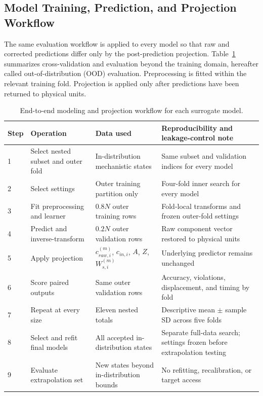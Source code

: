 \documentclass[a4paper,fleqn]{cas-sc}
\begin{document}
\subsection{Model Training, Prediction, and Projection Workflow}

The same evaluation workflow is applied to every model so that raw and corrected predictions differ only by the post-prediction projection. Table~\ref{tab:modeling_workflow} summarizes cross-validation and evaluation beyond the training domain, hereafter called out-of-distribution (OOD) evaluation. Preprocessing is fitted within the relevant training fold. Projection is applied only after predictions have been returned to physical units.

\begin{table}[htbp]
\centering
\caption{End-to-end modeling and projection workflow for each surrogate model.}
\label{tab:modeling_workflow}
\scriptsize
\setlength{\tabcolsep}{3pt}
\begin{tabular}{p{0.7cm}p{3.3cm}p{3.0cm}p{4.2cm}}
\hline
Step & Operation & Data used & Reproducibility and leakage-control note \\
\hline
1 & Select nested subset and outer fold & In-distribution mechanistic states & Same subset and validation indices for every model \\
2 & Select settings & Outer training partition only & Four-fold inner search for every model \\
3 & Fit preprocessing and learner & $0.8N$ outer training rows & Fold-local transforms and frozen outer-fold settings \\
4 & Predict and inverse-transform & $0.2N$ outer validation rows & Raw component vector restored to physical units \\
5 & Apply projection & $c_{raw,i}^{(m)}$, $c_{in,i}$, $A$, $Z$, $W_{s,i}^{(m)}$ & Underlying predictor remains unchanged \\
6 & Score paired outputs & Same outer validation rows & Accuracy, violations, displacement, and timing by fold \\
7 & Repeat at every size & Eleven nested totals & Descriptive mean $\pm$ sample SD across five folds \\
8 & Select and refit final models & All accepted in-distribution states & Separate full-data search; settings frozen before extrapolation testing \\
9 & Evaluate extrapolation set & New states beyond in-distribution bounds & No refitting, recalibration, or target access \\
\hline
\end{tabular}
\end{table}
\end{document}
